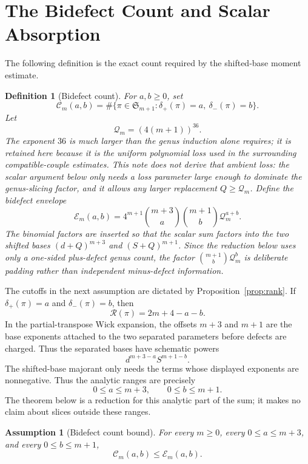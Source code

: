 \documentclass[11pt]{article}
\numberwithin{equation}{section}
\newtheorem{definition}[theorem]{Definition}
\newtheorem{assumption}[theorem]{Assumption}
\newcommand{\Sym}{\mathfrak S}
\newcommand{\dplus}{\delta_+}
\newcommand{\dminus}{\delta_-}
\newcommand{\rank}{\mathcal R}
\newcommand{\Count}{\mathcal C}
\newcommand{\Envelope}{\mathcal E}
\newcommand{\Qloss}{\mathcal Q}
\begin{document}
\section{The Bidefect Count and Scalar Absorption}

The following definition is the exact count required by the shifted-base
moment estimate.

\begin{definition}[Bidefect count]\label{def:bidefect-envelope}
For \(a,b\ge0\), set
\[
  \Count_m(a,b)=
  \#\{\pi\in\Sym_{m+1}:\dplus(\pi)=a,\ \dminus(\pi)=b\}.
\]
Let
\[
  \Qloss_m=(4(m+1))^{36}.
\]
The exponent \(36\) is much larger than the genus induction alone requires;
it is retained here because it is the uniform polynomial loss used in the
surrounding compatible-couple estimates.  This note does not derive that
ambient loss: the scalar argument below only needs a loss parameter large
enough to dominate the genus-slicing factor, and it allows any larger
replacement \(Q\ge \Qloss_m\).
Define the bidefect envelope
\[
  \Envelope_m(a,b)=
  4^{m+1}
  \binom{m+3}{a}
  \binom{m+1}{b}
  \Qloss_m^{a+b}.
\]
The binomial factors are inserted so that the scalar sum factors into the two
shifted bases \((d+Q)^{m+3}\) and \((S+Q)^{m+1}\).  Since the reduction below
uses only a one-sided plus-defect genus count, the factor
\(\binom{m+1}{b}\Qloss_m^b\) is deliberate padding rather than independent
minus-defect information.
\end{definition}

The cutoffs in the next assumption are dictated by
Proposition~\ref{prop:rank}.  If \(\dplus(\pi)=a\) and
\(\dminus(\pi)=b\), then
\[
  \rank(\pi)=2m+4-a-b.
\]
In the partial-transpose Wick expansion, the offsets \(m+3\) and \(m+1\) are
the base exponents attached to the two separated parameters before defects
are charged.  Thus the separated bases have schematic powers
\[
  d^{m+3-a}S^{m+1-b}.
\]
The shifted-base majorant only needs the terms whose displayed exponents are
nonnegative.  Thus the analytic ranges are precisely
\[
  0\le a\le m+3,\qquad 0\le b\le m+1.
\]
The theorem below is a reduction for this analytic part of the sum; it makes
no claim about slices outside these ranges.

\begin{assumption}[Bidefect count bound]\label{ass:count}
For every \(m\ge0\), every \(0\le a\le m+3\), and every
\(0\le b\le m+1\),
\[
  \Count_m(a,b)\le \Envelope_m(a,b).
\]
\end{assumption}
\end{document}
